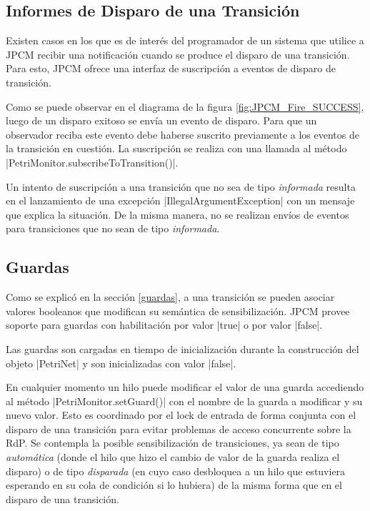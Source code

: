 \subsection{Informes de Disparo de una Transición}

Existen casos en los que es de interés del programador de un sistema que
utilice a JPCM recibir una notificación cuando se produce el disparo de una
transición. Para esto, JPCM ofrece una interfaz de suscripción a eventos de
disparo de transición.

Como se puede observar en el diagrama de la figura \ref{fig:JPCM_Fire_SUCCESS},
luego de un disparo exitoso se envía un evento de disparo. Para que un
observador reciba este evento debe haberse suscrito previamente a los eventos de
la transición en cuestión. La suscripción se realiza con una llamada al método
|PetriMonitor.subscribeToTransition()|.

Un intento de suscripción a una transición que no sea de tipo \textit{informada}
resulta en el lanzamiento de una excepción |IllegalArgumentException|
con un mensaje que explica la situación. De la misma manera, no se realizan
envíos de eventos para transiciones que no sean de tipo \textit{informada}.

\subsection{Guardas}

Como se explicó en la sección \ref{guardas}, a una transición se pueden asociar
valores booleanos que modifican su semántica de sensibilización. JPCM provee
soporte para guardas con habilitación por valor |true| o por valor
|false|.

Las guardas son cargadas en tiempo de inicialización durante la construcción
del objeto |PetriNet| y son inicializadas con valor
|false|.

En cualquier momento un hilo puede modificar el valor de una guarda accediendo
al método |PetriMonitor.setGuard()| con el nombre de la guarda a
modificar y su nuevo valor. Esto es coordinado por el lock de entrada de forma
conjunta con el disparo de una transición para evitar problemas de acceso
concurrente sobre la RdP. Se contempla la posible sensibilización de
transiciones, ya sean de tipo \textit{automática} (donde el hilo que hizo el
cambio de valor de la guarda realiza el disparo) o de tipo \textit{disparada}
(en cuyo caso desbloquea a un hilo que estuviera esperando en su cola de
condición si lo hubiera) de la misma forma que en el disparo de una transición.
